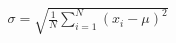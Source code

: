 \documentclass[preview]{standalone}
\begin{document}
\begin{align*}
\sigma = \sqrt{\frac{1}{N}\sum_{i=1}^{N}(x_i - \mu)^2}
\end{align*}
\end{document}
